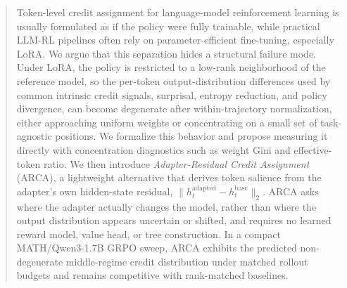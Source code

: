 \begin{abstract}\noindent Token-level credit assignment for language-model
reinforcement learning is usually formulated as if the policy were fully
trainable, while practical LLM-RL pipelines often rely on
parameter-efficient fine-tuning, especially LoRA. We argue that this
separation hides a structural failure mode. Under LoRA, the policy is
restricted to a low-rank neighborhood of the reference model, so the
per-token output-distribution differences used by common intrinsic credit
signals, surprisal, entropy reduction, and policy divergence, can become
degenerate after within-trajectory normalization, either approaching uniform
weights or concentrating on a small set of task-agnostic positions. We
formalize this behavior and propose measuring it directly with concentration
diagnostics such as weight Gini and effective-token ratio. We then introduce \emph{Adapter-Residual Credit
Assignment} (ARCA), a lightweight alternative that derives token salience from
the adapter's own hidden-state residual,
$\|h^{\text{adapted}}_t - h^{\text{base}}_t\|_2$. ARCA asks where the adapter
actually changes the model, rather than where the output distribution appears
uncertain or shifted, and requires no learned reward model, value head, or tree
construction. In a compact MATH/Qwen3-1.7B GRPO sweep, ARCA exhibits the
predicted non-degenerate middle-regime credit distribution under matched
rollout budgets and remains competitive with rank-matched baselines.
\end{abstract}
